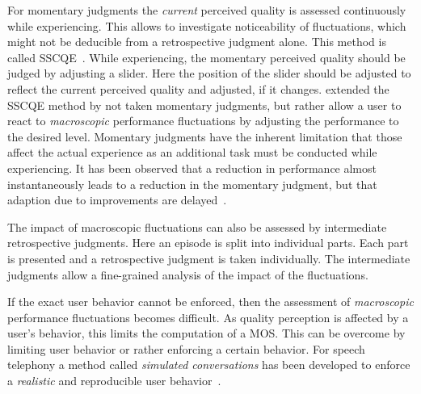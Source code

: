 For momentary judgments the \emph{current} perceived quality is assessed continuously while experiencing.
This allows to investigate noticeability of fluctuations, which might not be deducible from a retrospective judgment alone.
This method is called \ac{SSCQE}~\citep[][p. 137]{weiss_temporal_2014}.
While experiencing, the momentary perceived quality should be judged by adjusting a slider.
Here the position of the slider should be adjusted to reflect the current perceived quality and adjusted, if it changes.
\citet{borowiak_long_2013} extended the \ac{SSCQE} method by not taken momentary judgments, but rather allow a user to react to \emph{macroscopic} performance fluctuations by adjusting the performance to the desired level.
Momentary judgments have the inherent limitation that those affect the actual experience as an additional task must be conducted while experiencing.
It has been observed that a reduction in performance almost instantaneously leads to a reduction in the momentary judgment, but that adaption due to improvements are delayed~\cite[\eg,][]{hands_recency_2001, weiss_temporal_2014, hamberg_time-varying_1999}.

The impact of macroscopic fluctuations can also be assessed by intermediate retrospective judgments.
Here an episode is split into individual parts.
Each part is presented and a retrospective judgment is taken individually.
The intermediate judgments allow a fine-grained analysis of the impact of the fluctuations.

If the exact user behavior cannot be enforced, then the assessment of \emph{macroscopic} performance fluctuations becomes difficult.
As quality perception is affected by a user's behavior, this limits the computation of a \ac{MOS}. %
This can be overcome by limiting user behavior or rather enforcing a certain behavior.
For speech telephony a method called \emph{simulated conversations} has been developed to enforce a \emph{realistic} and reproducible user behavior~\citep{berger_estimation_2008}.

